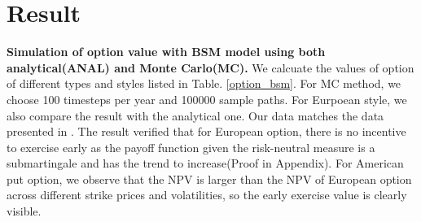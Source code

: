 \documentclass[a4paper]{article}
\begin{document}
\section{Result}
{\bf Simulation of option value with BSM model using both analytical(ANAL) and Monte Carlo(MC).} We calcuate the values of  option of different types and styles listed in Table. \ref{option_bsm}. For MC method, we choose 100 timesteps per year and 100000 sample paths. For Eurpoean style, we also compare the result with the analytical one. Our data matches the data presented in \cite{americanoption}. The result verified that for European option, there is no incentive to exercise early as the payoff function given the risk-neutral measure is a submartingale and has the trend to increase(Proof in Appendix). For American put option, we observe that the NPV is larger than the NPV of European option across different strike prices and volatilities, so the early exercise value is clearly visible.
\end{document}
